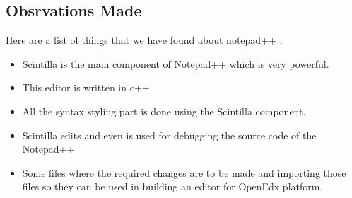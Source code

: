 \subsection{Obsrvations Made} 
Here are a list of things that we have found about notepad++ : 
\begin{itemize}
\item Scintilla is the main component of Notepad++ which is very powerful.
\item This editor is written in c++
\item All the syntax styling part is done using the Scintilla component.
\item Scintilla edits and even is used for debugging the source code of the Notepad++
\item Some files where the required changes are to be made and importing those files so they can
be used in building an editor for OpenEdx platform. \newline
\end{itemize}  
